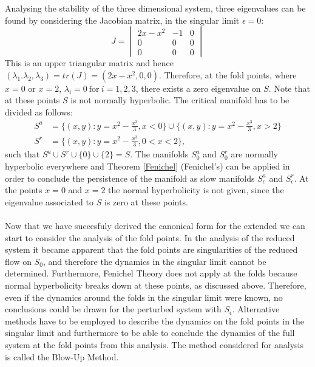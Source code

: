 Analysing the stability of the three dimensional system, three eigenvalues can be found by considering the Jacobian matrix, in the singular limit $\epsilon=0$: 
\begin{equation} 
J=\begin{vmatrix} 2x-x^2 & -1&0 \\ 0 & 0&0\\0&0&0\end{vmatrix}
\label{eq: Eigenvalues}
\end{equation}
This is an upper triangular matrix and hence $(\lambda_1.\lambda_2,\lambda_3)=tr(J)= (2x-x^2,0,0)$. Therefore, at the fold points, where $x=0$ or $x=2$, $\lambda_i=0 \ \text{for} \ i=1,2,3$, there exists a zero eigenvalue on $S$. Note that at these points $S$ is not normally hyperbolic.
The critical manifold has to be divided as follows:
\begin{align*}
S^a &= \{ (x,y): y = x^2-\frac{x^3}{3}, x< 0 \} \cup  \{ (x,y): y = x^2-\frac{x^3}{3}, x>2 \} \\
S^r &= \{ (x,y): y = x^2-\frac{x^3}{3}, 0< x< 2 \},
\end{align*}
such that $S^a \cup S^r \cup \{0\} \cup \{2\} = S$.
The manifolds $S^a_0$ and $S^r_0$ are normally hyperbolic everywhere and  Theorem \ref{Fenichel} (Fenichel's) can be applied in order to conclude the persistence of the manifold as slow manifolds $S^a_\epsilon$ and $S^r_\epsilon$. At the points $x=0$ and $x=2$ the normal hyperbolicity is not given, since the eigenvalue associated to $S$ is zero at these points.
\\
\\
Now that we have succesfuly derived the canonical form for the extended \vdp we can start to consider the analysis of the fold points. In the analysis of the reduced system it became apparent that the fold points are singularities of the reduced flow on $S_0$, and therefore the dynamics in the singular limit cannot be determined. Furthermore, Fenichel Theory does not apply at the folds because normal hyperbolicity breaks down at these points, as discussed above. Therefore, even if the dynamics around the folds in the singular limit were known, no conclusions could be drawn for the perturbed system with $S_\epsilon$.
Alternative methods have to be employed to describe the dynamics on the fold points in the singular limit and furthermore to be able to conclude the dynamics of the full system at the fold points from this analysis.
The method considered for analysis is called the Blow-Up Method.























